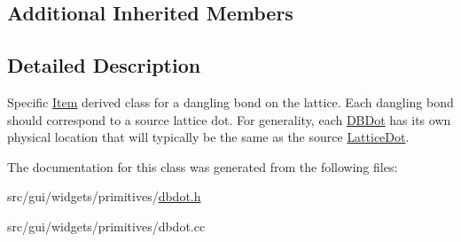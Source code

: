 \subsection*{Additional Inherited Members}


\subsection{Detailed Description}
Specific \hyperlink{classprim_1_1Item}{Item} derived class for a dangling bond on the lattice. Each dangling bond should correspond to a source lattice dot. For generality, each \hyperlink{classprim_1_1DBDot}{D\+B\+Dot} has its own physical location that will typically be the same as the source \hyperlink{classprim_1_1LatticeDot}{Lattice\+Dot}. 

The documentation for this class was generated from the following files\+:\begin{DoxyCompactItemize}
\item 
src/gui/widgets/primitives/\hyperlink{dbdot_8h}{dbdot.\+h}\item 
src/gui/widgets/primitives/dbdot.\+cc\end{DoxyCompactItemize}
